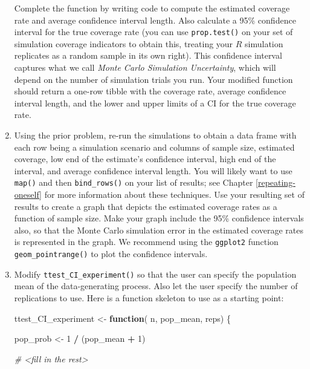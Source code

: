 \documentclass[
]{book}
\newenvironment{Shaded}{\begin{snugshade}}{\end{snugshade}}
\newcommand{\CommentTok}[1]{\textcolor[rgb]{0.56,0.35,0.01}{\textit{#1}}}
\newcommand{\ControlFlowTok}[1]{\textcolor[rgb]{0.13,0.29,0.53}{\textbf{#1}}}
\newcommand{\DecValTok}[1]{\textcolor[rgb]{0.00,0.00,0.81}{#1}}
\newcommand{\NormalTok}[1]{#1}
\newcommand{\OtherTok}[1]{\textcolor[rgb]{0.56,0.35,0.01}{#1}}
\newcommand{\SpecialCharTok}[1]{\textcolor[rgb]{0.81,0.36,0.00}{\textbf{#1}}}
\begin{document}
\begin{enumerate}
  Complete the function by writing code to compute the estimated coverage rate and average confidence interval length. Also calculate a 95\% confidence interval for the true coverage rate (you can use \texttt{prop.test()} on your set of simulation coverage indicators to obtain this, treating your \(R\) simulation replicates as a random sample in its own right). This confidence interval captures what we call \emph{Monte Carlo Simulation Uncertainty}, which will depend on the number of simulation trials you run. Your modified function should return a one-row tibble with the coverage rate, average confidence interval length, and the lower and upper limits of a CI for the true coverage rate.
\item
  Using the prior problem, re-run the simulations to obtain a data frame with each row being a simulation scenario and columns of sample size, estimated coverage, low end of the estimate's confidence interval, high end of the interval, and average confidence interval length. You will likely want to use \texttt{map()} and then \texttt{bind\_rows()} on your list of results; see Chapter \ref{repeating-oneself} for more information about these techniques.
  Use your resulting set of results to create a graph that depicts the estimated coverage rates as a function of sample size. Make your graph include the 95\% confidence intervals also, so that the Monte Carlo simulation error in the estimated coverage rates is represented in the graph. We recommend using the \texttt{ggplot2} function \texttt{geom\_pointrange()} to plot the confidence intervals.
\item
  Modify \texttt{ttest\_CI\_experiment()} so that the user can specify the population mean of the data-generating process. Also let the user specify the number of replications to use. Here is a function skeleton to use as a starting point:

\begin{Shaded}
\begin{Highlighting}[]
\NormalTok{ttest\_CI\_experiment }\OtherTok{\textless{}{-}} \ControlFlowTok{function}\NormalTok{( n, pop\_mean, reps) \{}

\NormalTok{  pop\_prob }\OtherTok{\textless{}{-}} \DecValTok{1} \SpecialCharTok{/}\NormalTok{ (pop\_mean }\SpecialCharTok{+} \DecValTok{1}\NormalTok{)}

  \CommentTok{\# \textless{}fill in the rest\textgreater{}}


\end{Highlighting}
\end{Shaded}
\end{enumerate}
\end{document}
